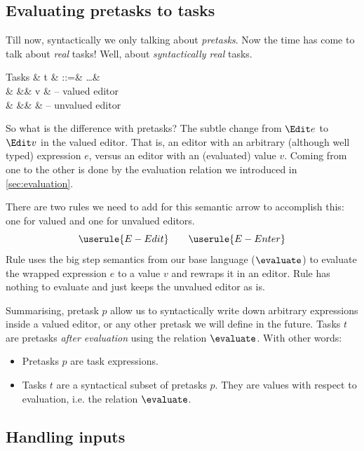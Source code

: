 \subsection{Evaluating pretasks to tasks}
\label{sec:tasks-vs-pretasks}

Till now, syntactically we only talking about \emph{pretasks}.
Now the time has come to talk about \emph{real} tasks!
Well, about \emph{syntactically real} tasks.
\begin{grammar}
  Tasks
    & t & ::=& \ldots       & \\
    &   &\mid& \Edit v      & – valued editor \\
    &   &\mid& \Enter \beta & – unvalued editor \\
\end{grammar}

So what is the difference with pretasks?
The subtle change from $\Edit e$ to $\Edit v$ in the valued editor.
That is, an editor with an arbitrary (although well typed) expression $e$,
versus an editor with an (evaluated) value $v$.
Coming from one to the other is done by the evaluation relation we introduced in \autoref{sec:evaluation}.

There are two rules we need to add for this semantic arrow to accomplish this:
one for valued and one for unvalued editors.
\begin{equation*}
  \userule{E-Edit} \qquad \userule{E-Enter}
\end{equation*}
Rule  uses the big step semantics from our base language ($\evaluate$)
to evaluate the wrapped expression $e$ to a value $v$ and rewraps it in an editor.
Rule  has nothing to evaluate and just keeps the unvalued editor as is.

Summarising, pretask $p$ allow us to syntactically write down arbitrary expressions inside a valued editor,
or any other pretask we will define in the future.
Tasks $t$ are pretasks \emph{after evaluation} using the relation $\evaluate$.
With other words:
\begin{itemize}
  \item
    Pretasks $p$ are task expressions.
  \item
    Tasks $t$ are a syntactical subset of pretasks $p$.
    They are values with respect to evaluation, i.e. the relation $\evaluate$.
\end{itemize}


\subsection{Handling inputs}
\label{sec:handling}

